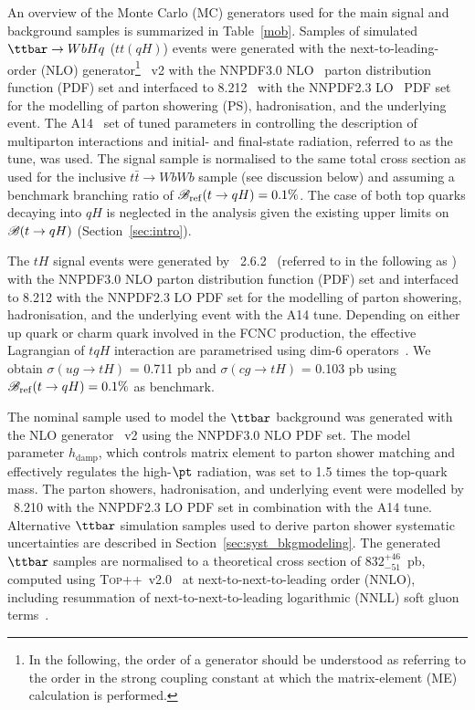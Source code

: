 \documentclass[PAPER, coverpage, atlasdraft=true, texlive=2016, UKenglish]{\ATLASLATEXPATH atlasdoc}
\begin{document}
An overview of the Monte Carlo (MC) generators used for the main signal and background samples is summarized in Table~\ref{mob}.
Samples of simulated $\ttbar \to WbHq$ ($tt(qH)$) events were generated with the next-to-leading-order (NLO) generator\footnote{In the following, 
the order of a generator should be understood as referring to the order in the strong coupling constant at which the matrix-element (ME) calculation 
is performed.} {\powheg}~v2 \cite{Frixione:2007nw,Nason:2004rx,Frixione:2007vw,Alioli:2010xd}
with the NNPDF3.0 NLO~\cite{Ball:2014uwa} parton distribution function (PDF) set and interfaced to {\pythia} 8.212~\cite{Sjostrand:2007gs} with the NNPDF2.3 LO~\cite{Ball:2012cx} PDF set for the modelling of parton showering (PS), hadronisation, and the underlying event. 
The A14~\cite{ATLASUETune4} set of tuned parameters in {\pythia} controlling the description of multiparton interactions and  
initial- and final-state radiation, referred to as the tune, was used.
The signal sample is normalised to the same total cross section as used for the inclusive $t\bar{t}\to WbWb$ sample (see discussion below) and
assuming a benchmark branching ratio of $\mathscr{B}_{\mathrm{ref}}(t\to qH)=0.1\%$.
The case of both top quarks decaying into $qH$ is neglected in the analysis given the existing upper limits on $\mathscr{B}(t \to qH)$ (Section~\ref{sec:intro}).

The $tH$ signal events were generated by {\amcatnlolong}~2.6.2~\cite{Alwall:2014hca}  (referred to in the following as {\amcatnlo})
with the NNPDF3.0 NLO parton distribution function (PDF) set and interfaced to {\pythia} 8.212 with the NNPDF2.3 LO PDF set for the modelling of parton showering,
hadronisation, and the underlying event with the A14 tune.
Depending on either up quark or charm quark involved in the FCNC production, the effective Lagrangian of $tqH$ interaction are parametrised using
dim-6 operators~\cite{fcnc_production_theory}. We obtain $\sigma(ug\to tH)$ = 0.711 pb and $\sigma(cg\to tH)$ = 0.103 pb using $\mathscr{B}_{\mathrm{ref}}(t\to qH)=0.1\%$ as benchmark.   

The nominal sample used to model the $\ttbar$ background was generated with the NLO generator {\powheg}~v2
using the NNPDF3.0 NLO PDF set. The {\powheg} model parameter $h_{\textrm{damp}}$, which controls 
matrix element to parton shower matching and effectively regulates the high-$\pt$ radiation, was set to 1.5 times the top-quark mass. 
The parton showers, hadronisation, and underlying event were modelled by {\pythia}~8.210 with the NNPDF2.3 LO PDF set in combination with the A14 tune.
Alternative $\ttbar$ simulation samples used to derive parton shower systematic uncertainties are described in Section~\ref{sec:syst_bkgmodeling}. 
The generated $\ttbar$ samples are normalised to a theoretical cross section of $832^{+46}_{-51}$~pb, 
computed using \textsc{Top++}~v2.0~\cite{Czakon:2011xx} at next-to-next-to-leading order (NNLO), 
including resummation of next-to-next-to-leading logarithmic (NNLL) soft gluon 
terms~\cite{Cacciari:2011hy,Baernreuther:2012ws,Czakon:2012zr,Czakon:2012pz,Czakon:2013goa}.
\end{document}

